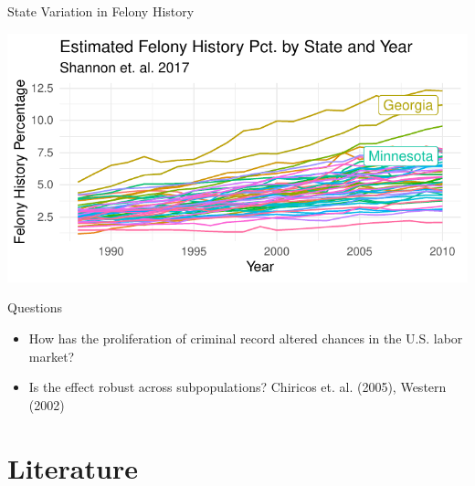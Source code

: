 \documentclass{beamer}
\begin{document}
\begin{frame}{State Variation in Felony History}
\begin{knitrout}
\color{fgcolor}
\includegraphics[width=\maxwidth]{figure/unnamed-chunk-7-1} 

\end{knitrout}
\end{frame}

\begin{frame}{Questions}
\begin{block}{}
\begin{itemize}

\item How has the proliferation of criminal record altered chances in the U.S. labor market?

\item Is the effect robust across subpopulations? Chiricos et. al. (2005), Western (2002)

\end{itemize}
\end{block}
\end{frame}

\section{Literature}
\end{document}
